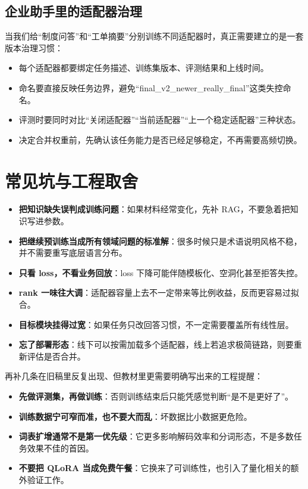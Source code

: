 \subsection{企业助手里的适配器治理}
当我们给“制度问答”和“工单摘要”分别训练不同适配器时，真正需要建立的是一套版本治理习惯：
\begin{itemize}
  \item 每个适配器都要绑定任务描述、训练集版本、评测结果和上线时间。
  \item 命名要直接反映任务边界，避免“final\_v2\_newer\_really\_final”这类失控命名。
  \item 评测时要同时对比“关闭适配器”“当前适配器”“上一个稳定适配器”三种状态。
  \item 决定合并权重前，先确认该任务能力是否已经足够稳定，不再需要高频切换。
\end{itemize}

\section{常见坑与工程取舍}
\begin{itemize}
  \item \textbf{把知识缺失误判成训练问题}：如果材料经常变化，先补 RAG，不要急着把知识写进参数。
  \item \textbf{把继续预训练当成所有领域问题的标准解}：很多时候只是术语说明风格不稳，并不需要重写底层语言分布。
  \item \textbf{只看 loss，不看业务回放}：loss 下降可能伴随模板化、空洞化甚至拒答失控。
  \item \textbf{rank 一味往大调}：适配器容量上去不一定带来等比例收益，反而更容易过拟合。
  \item \textbf{目标模块挂得过宽}：如果任务只改回答习惯，不一定需要覆盖所有线性层。
  \item \textbf{忘了部署形态}：线下可以按需加载多个适配器，线上若追求极简链路，则要重新评估是否合并。
\end{itemize}

再补几条在旧稿里反复出现、但教材里更需要明确写出来的工程提醒：
\begin{itemize}
  \item \textbf{先做评测集，再做训练}：否则训练结束后只能凭感觉判断“是不是更好了”。
  \item \textbf{训练数据宁可窄而准，也不要大而乱}：坏数据比小数据更危险。
  \item \textbf{词表扩增通常不是第一优先级}：它更多影响解码效率和分词形态，不是多数任务效果不佳的首因。
  \item \textbf{不要把 QLoRA 当成免费午餐}：它换来了可训练性，也引入了量化相关的额外验证工作。
\end{itemize}


